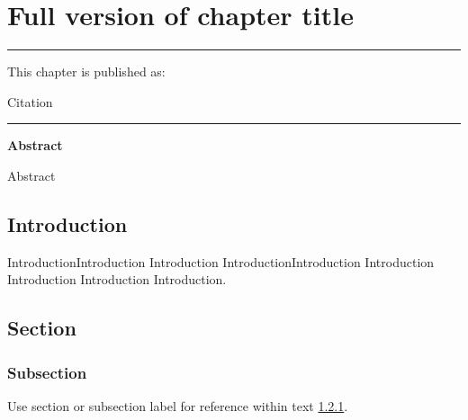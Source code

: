 
\chapter[Short version of title for header]{Full version of chapter title} %

% 

\label{Chapter4} %



\noindent \rule{\textwidth}{0.4pt}

\medskip

\noindent This chapter is published as:

\medskip

\noindent \hangindent=0.6cm Citation



\noindent\rule{\textwidth}{0.4pt}

\bigskip


\noindent \textbf{Abstract}

\medskip

\noindent
Abstract

\bigskip

\begin{multicols}{2}


\section{Introduction}

IntroductionIntroduction Introduction IntroductionIntroduction Introduction Introduction Introduction Introduction.

\section{Section}

\subsection{Subsection}
\label{subsec:subsectionname4}

Use section or subsection label for reference within text \ref{subsec:subsectionname4}.



\end{multicols}
